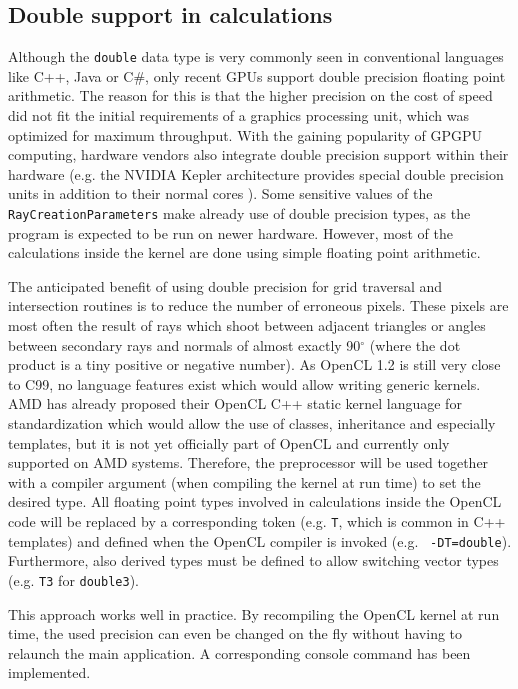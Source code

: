 \subsection{Double support in calculations}

Although the \lstinline!double! data type is very commonly seen in conventional languages like C++, Java or C\#, only recent GPUs support double precision floating point arithmetic. The reason for this is that the higher precision on the cost of speed did not fit the initial requirements of a graphics processing unit, which was optimized for maximum throughput. With the gaining popularity of GPGPU computing, hardware vendors also integrate double precision support within their hardware (e.g. the NVIDIA Kepler architecture provides special double precision units in addition to their normal cores \cite[p.8]{kepler_arch}). Some sensitive values of the \lstinline!RayCreationParameters! make already use of double precision types, as the program is expected to be run on newer hardware. However, most of the calculations inside the kernel are done using simple floating point arithmetic.

The anticipated benefit of using double precision for grid traversal and intersection routines is to reduce the number of erroneous pixels. These pixels are most often the result of rays which shoot between adjacent triangles or angles between secondary rays and normals of almost exactly 90$^\circ$ (where the dot product is a tiny positive or negative number). As OpenCL 1.2 is still very close to C99, no language features exist which would allow writing generic kernels. AMD has already proposed their OpenCL C++ static kernel language for standardization which would allow the use of classes, inheritance and especially templates, but it is not yet officially part of OpenCL and currently only supported on AMD systems. Therefore, the preprocessor will be used together with a compiler argument (when compiling the kernel at run time) to set the desired type. All floating point types involved in calculations inside the OpenCL code will be replaced by a corresponding token (e.g. \lstinline!T!, which is common in C++ templates) and defined when the OpenCL compiler is invoked (e.g. \lstinline! -DT=double!). Furthermore, also derived types must be defined to allow switching vector types (e.g. \lstinline!T3! for \lstinline!double3!).

This approach works well in practice. By recompiling the OpenCL kernel at run time, the used precision can even be changed on the fly without having to relaunch the main application. A corresponding console command has been implemented.

